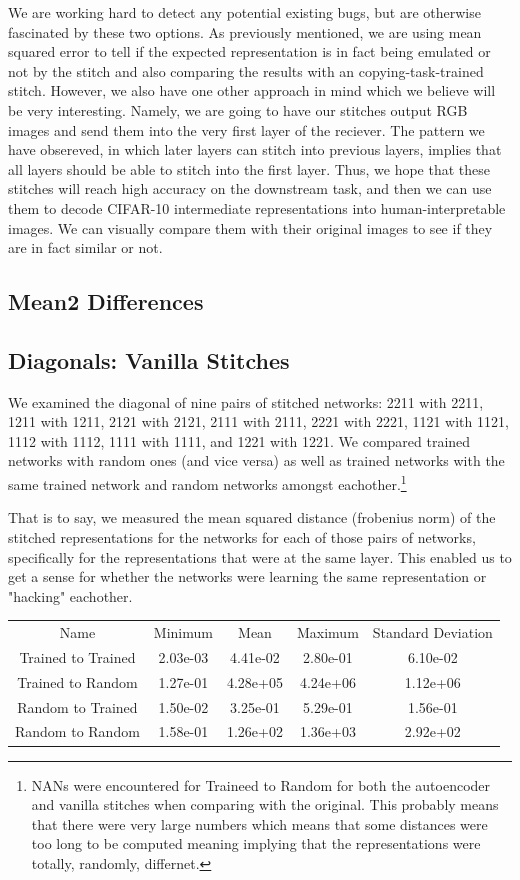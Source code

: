 \documentclass{article} %
\begin{document}
We are working hard to detect any potential existing bugs, but are otherwise fascinated by these two options. As
previously mentioned, we are using mean squared error to tell if the expected representation is in fact being emulated
or not by the stitch and also comparing the results with an copying-task-trained stitch. However, we also have one other
approach in mind which we believe will be very interesting. Namely, we are going to have our stitches output RGB images
and send them into the very first layer of the reciever. The pattern we have obsereved, in which later layers can stitch
into previous layers, implies that all layers should be able to stitch into the first layer. Thus, we hope that these
stitches will reach high accuracy on the downstream task, and then we can use them to decode CIFAR-10 intermediate
representations into human-interpretable images. We can visually compare them with their original images to see if
they are in fact similar or not.

\subsection*{Mean2 Differences}
\subsection*{Diagonals: Vanilla Stitches}
We examined the diagonal of nine pairs of stitched networks: 2211 with 2211, 1211 with 1211, 
2121 with 2121, 2111 with 2111, 2221 with 2221, 1121 with 1121, 1112 with 1112, 1111 with 1111, 
and 1221 with 1221. We compared trained networks with random ones (and vice versa) as well as trained
networks with the same trained network and random networks amongst eachother.\footnote{NANs were encountered for 
Traineed to Random for both the autoencoder and vanilla stitches when comparing with the original. This probably means 
that there were
very large numbers which means that some distances were too long to be computed meaning implying that
the representations were totally, randomly, differnet.}

That is to say, we measured the mean squared distance (frobenius norm) of the stitched representations for the networks
for each of those pairs of networks, specifically for the representations that were at the same layer. This enabled us
to get a sense for whether the networks were learning the same representation or "hacking" eachother.

\begin{tabular}{c c c c c}
   Name&Minimum&Mean&Maximum&Standard Deviation\\
   Trained to Trained&2.03e-03&4.41e-02&2.80e-01&6.10e-02\\
   Trained to Random&1.27e-01&4.28e+05&4.24e+06&1.12e+06\\
   Random to Trained&1.50e-02&3.25e-01&5.29e-01&1.56e-01\\
   Random to Random&1.58e-01&1.26e+02&1.36e+03&2.92e+02\\
\end{tabular}
   
\end{document}
